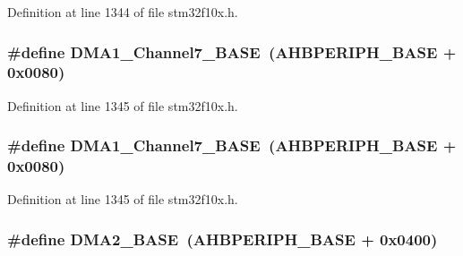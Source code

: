 Definition at line 1344 of file stm32f10x.\+h.

\subsubsection[{\texorpdfstring{D\+M\+A1\+\_\+\+Channel7\+\_\+\+B\+A\+SE}{DMA1_Channel7_BASE}}]{\setlength{\rightskip}{0pt plus 5cm}\#define D\+M\+A1\+\_\+\+Channel7\+\_\+\+B\+A\+SE~({\bf A\+H\+B\+P\+E\+R\+I\+P\+H\+\_\+\+B\+A\+SE} + 0x0080)}\hypertarget{group___peripheral__memory__map_gaeee0d1f77d0db1db533016a09351166c}{}\label{group___peripheral__memory__map_gaeee0d1f77d0db1db533016a09351166c}


Definition at line 1345 of file stm32f10x.\+h.

\subsubsection[{\texorpdfstring{D\+M\+A1\+\_\+\+Channel7\+\_\+\+B\+A\+SE}{DMA1_Channel7_BASE}}]{\setlength{\rightskip}{0pt plus 5cm}\#define D\+M\+A1\+\_\+\+Channel7\+\_\+\+B\+A\+SE~({\bf A\+H\+B\+P\+E\+R\+I\+P\+H\+\_\+\+B\+A\+SE} + 0x0080)}\hypertarget{group___peripheral__memory__map_gaeee0d1f77d0db1db533016a09351166c}{}\label{group___peripheral__memory__map_gaeee0d1f77d0db1db533016a09351166c}


Definition at line 1345 of file stm32f10x.\+h.

\subsubsection[{\texorpdfstring{D\+M\+A2\+\_\+\+B\+A\+SE}{DMA2_BASE}}]{\setlength{\rightskip}{0pt plus 5cm}\#define D\+M\+A2\+\_\+\+B\+A\+SE~({\bf A\+H\+B\+P\+E\+R\+I\+P\+H\+\_\+\+B\+A\+SE} + 0x0400)}\hypertarget{group___peripheral__memory__map_gab72a9ae145053ee13d1d491fb5c1df64}{}\label{group___peripheral__memory__map_gab72a9ae145053ee13d1d491fb5c1df64}


